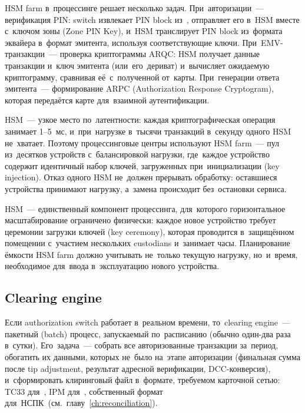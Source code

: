 HSM farm в~процессинге решает несколько задач. При~авторизации~---
верификация PIN: switch извлекает PIN block из~, отправляет
его в~HSM вместе с~ключом зоны (Zone PIN Key), и~HSM
транслирует PIN block из~формата эквайера в~формат эмитента,
используя соответствующие ключи. При~EMV-транзакции~---
проверка криптограммы ARQC: HSM получает данные транзакции
и~ключ эмитента (или~его~дериват) и~вычисляет ожидаемую
криптограмму, сравнивая её~с~полученной от~карты. При~генерации
ответа эмитента~--- формирование ARPC (Authorization Response
Cryptogram), которая передаётся карте для~взаимной
аутентификации.

HSM~--- узкое место по~латентности: каждая криптографическая
операция занимает 1--5~мс, и~при~нагрузке в~тысячи транзакций
в~секунду одного HSM не~хватает. Поэтому процессинговые центры
используют HSM farm~--- пул из~десятков устройств
с~балансировкой нагрузки, где~каждое устройство содержит
идентичный набор ключей, загруженных при~инициализации
(key injection). Отказ одного HSM не~должен прерывать
обработку: оставшиеся устройства принимают нагрузку,
а~замена происходит без~остановки сервиса.

\begin{important}
  HSM~--- единственный компонент процессинга, для~которого
  горизонтальное масштабирование ограничено физически: каждое
  новое устройство требует церемонии загрузки ключей
  (key ceremony), которая проводится в~защищённом помещении
  с~участием нескольких custodians и~занимает часы. Планирование
  ёмкости HSM farm должно учитывать не~только текущую нагрузку,
  но~и~время, необходимое для~ввода в~эксплуатацию нового
  устройства.
\end{important}

\subsection*{Clearing engine}

Если authorization switch работает в~реальном времени,
то~clearing engine~--- пакетный (batch) процесс, запускаемый
по~расписанию (обычно один-два раза в~сутки). Его~задача~---
собрать все авторизованные транзакции за~период, обогатить их
данными, которых не~было на~этапе авторизации (финальная сумма
после tip adjustment, результат адресной верификации,
DCC-конверсия), и~сформировать клиринговый файл в~формате,
требуемом карточной сетью: TC33 для~,
IPM для~, собственный формат
для~НСПК~(см.~главу~\ref{ch:reconciliation}).

